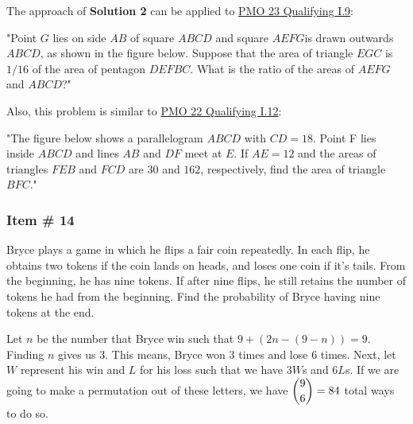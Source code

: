 \documentclass[11pt,paper=letter]{scrartcl}
\begin{document}
\begin{mdframed}
\begin{rem}
The approach of \textbf{Solution 2} can be applied to \href{https://pmo.ph/wp-content/uploads/2021/02/PMO23-Qualifying-Round.pdf}{PMO 23 Qualifying I.9}: 

"Point $G$ lies on side $AB$ of square $ABCD$ and square $AEFG$is drawn outwards $ABCD$, as
shown in the figure below. Suppose that the area of triangle $EGC$ is $1/16$ of the area of
pentagon $DEFBC$. What is the ratio of the areas of $AEFG$ and $ABCD$?"

\end{rem}

\begin{rem} Also, this problem is similar to \href{https://pmo.ph/wp-content/uploads/2019/11/PMO-22-Qualifying-Round-with-answers.pdf}{PMO 22 Qualifying I.12}:

"The figure below shows a parallelogram $ABCD$ with $CD = 18$. Point F lies inside $ABCD$ and
lines $AB$ and $DF$ meet at $E$. If $AE = 12$ and the areas of triangles $FEB$ and $FCD$ are 30
and $162$, respectively, find the area of triangle $BFC$."
\end{rem}
\end{mdframed}

\subsubsection{Item \# 14}

\begin{probboxed}
\item Bryce plays a game in which he flips a fair coin repeatedly. In each flip, he obtains two tokens if the coin lands on heads, and loses one coin if it's tails. From the beginning, he has nine tokens. If after nine flips, he still retains the number of tokens he had from the beginning. Find the probability of Bryce having nine tokens at the end. 

\end{probboxed}


\sol Let $n$ be the number that Bryce win such that $9 + \left(2n-(9-n)\right) = 9 $. Finding $n$ gives us 3. This means, Bryce won 3 times and lose 6 times. Next, let $W$ represent his win and $L$ for his loss such that we have 3$W$s and 6$L$s. If we are going to make a permutation out of these letters, we have $\dbinom{9}{6} = 84$ total ways to do so.
\end{document}
